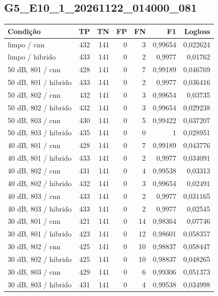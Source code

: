\subsection{G5\_E10\_1\_20261122\_014000\_081}
\small\begin{longtable}{@{}p{.38\linewidth}rrrrrr@{}}
\toprule Condição & TP & TN & FP & FN & F1 & Logloss\\\midrule\endhead
limpo /\allowbreak{} cnn & 432 & 141 & 0 & 3 & 0,99654 & 0,022624\\
limpo /\allowbreak{} hibrido & 433 & 141 & 0 & 2 & 0,9977 & 0,01762\\
50 dB, 801 /\allowbreak{} cnn & 428 & 141 & 0 & 7 & 0,99189 & 0,046769\\
50 dB, 801 /\allowbreak{} hibrido & 433 & 141 & 0 & 2 & 0,9977 & 0,036416\\
50 dB, 802 /\allowbreak{} cnn & 432 & 141 & 0 & 3 & 0,99654 & 0,03735\\
50 dB, 802 /\allowbreak{} hibrido & 432 & 141 & 0 & 3 & 0,99654 & 0,029238\\
50 dB, 803 /\allowbreak{} cnn & 430 & 141 & 0 & 5 & 0,99422 & 0,037207\\
50 dB, 803 /\allowbreak{} hibrido & 435 & 141 & 0 & 0 & 1 & 0,028951\\
40 dB, 801 /\allowbreak{} cnn & 428 & 141 & 0 & 7 & 0,99189 & 0,043776\\
40 dB, 801 /\allowbreak{} hibrido & 433 & 141 & 0 & 2 & 0,9977 & 0,034091\\
40 dB, 802 /\allowbreak{} cnn & 431 & 141 & 0 & 4 & 0,99538 & 0,03313\\
40 dB, 802 /\allowbreak{} hibrido & 432 & 141 & 0 & 3 & 0,99654 & 0,02491\\
40 dB, 803 /\allowbreak{} cnn & 433 & 141 & 0 & 2 & 0,9977 & 0,031165\\
40 dB, 803 /\allowbreak{} hibrido & 433 & 141 & 0 & 2 & 0,9977 & 0,02545\\
30 dB, 801 /\allowbreak{} cnn & 421 & 141 & 0 & 14 & 0,98364 & 0,07746\\
30 dB, 801 /\allowbreak{} hibrido & 423 & 141 & 0 & 12 & 0,98601 & 0,058357\\
30 dB, 802 /\allowbreak{} cnn & 425 & 141 & 0 & 10 & 0,98837 & 0,058447\\
30 dB, 802 /\allowbreak{} hibrido & 425 & 141 & 0 & 10 & 0,98837 & 0,048265\\
30 dB, 803 /\allowbreak{} cnn & 429 & 141 & 0 & 6 & 0,99306 & 0,051373\\
30 dB, 803 /\allowbreak{} hibrido & 431 & 141 & 0 & 4 & 0,99538 & 0,034998\\

\end{longtable}
